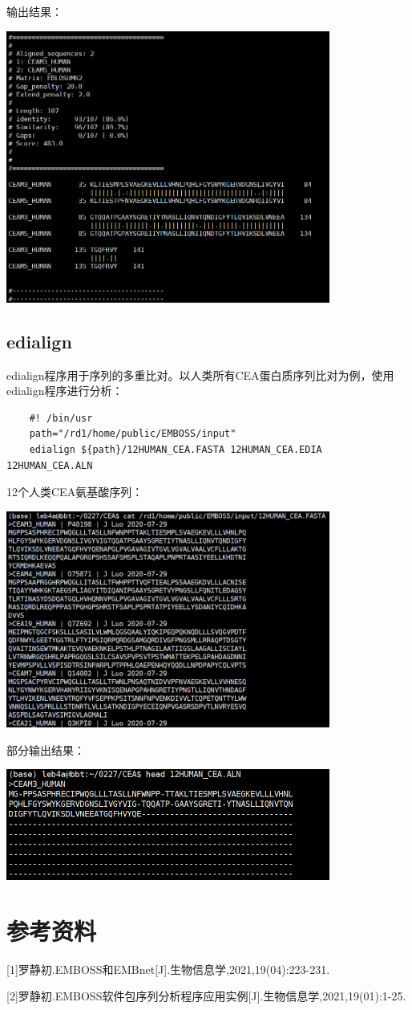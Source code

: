 输出结果：

\includegraphics[width=0.8\textwidth]{./image/gdk/5.2.4.png}

\subsection{edialign}

edialign程序用于序列的多重比对。以人类所有CEA蛋白质序列比对为例，使用edialign程序进行分析：

\begin{lstlisting}
    #! /bin/usr
    path="/rd1/home/public/EMBOSS/input"
    edialign ${path}/12HUMAN_CEA.FASTA 12HUMAN_CEA.EDIA 12HUMAN_CEA.ALN
\end{lstlisting}

12个人类CEA氨基酸序列：

\includegraphics[width=0.8\textwidth]{./image/gdk/5.2.5.png}

部分输出结果：

\includegraphics[width=0.8\textwidth]{./image/gdk/5.2.6.png}

\section*{参考资料}
[1]罗静初.EMBOSS和EMBnet[J].生物信息学,2021,19(04):223-231.

[2]罗静初.EMBOSS软件包序列分析程序应用实例[J].生物信息学,2021,19(01):1-25.